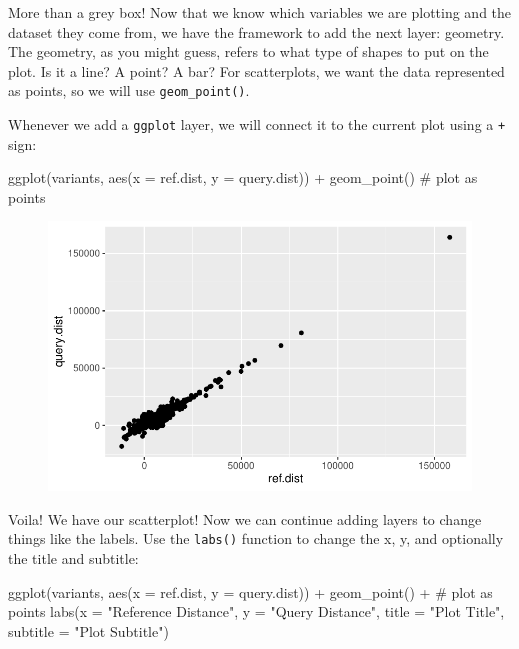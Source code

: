 \documentclass[
  letterpaper,
  DIV=11,
  numbers=noendperiod]{scrreprt}
\newenvironment{Shaded}{\begin{snugshade}}{\end{snugshade}}
\newcommand{\AttributeTok}[1]{\textcolor[rgb]{0.40,0.45,0.13}{#1}}
\newcommand{\CommentTok}[1]{\textcolor[rgb]{0.37,0.37,0.37}{#1}}
\newcommand{\FunctionTok}[1]{\textcolor[rgb]{0.28,0.35,0.67}{#1}}
\newcommand{\NormalTok}[1]{\textcolor[rgb]{0.00,0.23,0.31}{#1}}
\newcommand{\SpecialCharTok}[1]{\textcolor[rgb]{0.37,0.37,0.37}{#1}}
\newcommand{\StringTok}[1]{\textcolor[rgb]{0.13,0.47,0.30}{#1}}
\begin{document}
More than a grey box! Now that we know which variables we are plotting
and the dataset they come from, we have the framework to add the next
layer: geometry. The geometry, as you might guess, refers to what type
of shapes to put on the plot. Is it a line? A point? A bar? For
scatterplots, we want the data represented as points, so we will use
\texttt{geom\_point()}.

Whenever we add a \texttt{ggplot} layer, we will connect it to the
current plot using a \texttt{+} sign:

\begin{Shaded}
\begin{Highlighting}[]
\FunctionTok{ggplot}\NormalTok{(variants, }\FunctionTok{aes}\NormalTok{(}\AttributeTok{x =}\NormalTok{ ref.dist, }\AttributeTok{y =}\NormalTok{ query.dist)) }\SpecialCharTok{+}
  \FunctionTok{geom\_point}\NormalTok{() }\CommentTok{\# plot as points}
\end{Highlighting}
\end{Shaded}

\begin{figure}[H]

{\centering \includegraphics{scripts/02_dataViz/class3_files/figure-pdf/unnamed-chunk-10-1.pdf}

}

\end{figure}

Voila! We have our scatterplot! Now we can continue adding layers to
change things like the labels. Use the \texttt{labs()} function to
change the x, y, and optionally the title and subtitle:

\begin{Shaded}
\begin{Highlighting}[]
\FunctionTok{ggplot}\NormalTok{(variants, }\FunctionTok{aes}\NormalTok{(}\AttributeTok{x =}\NormalTok{ ref.dist, }\AttributeTok{y =}\NormalTok{ query.dist)) }\SpecialCharTok{+}
  \FunctionTok{geom\_point}\NormalTok{() }\SpecialCharTok{+} \CommentTok{\# plot as points}
  \FunctionTok{labs}\NormalTok{(}\AttributeTok{x =} \StringTok{"Reference Distance"}\NormalTok{,}
       \AttributeTok{y =} \StringTok{"Query Distance"}\NormalTok{,}
       \AttributeTok{title =} \StringTok{"Plot Title"}\NormalTok{,}
       \AttributeTok{subtitle =} \StringTok{"Plot Subtitle"}\NormalTok{)}
\end{Highlighting}
\end{Shaded}
\end{document}
